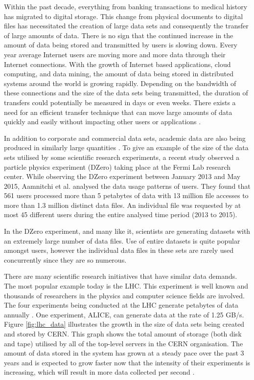 Within the past decade, everything from banking transactions to medical history has migrated to digital storage. This change from physical documents to digital files has necessitated the creation of large data sets and consequently the transfer of large amounts of data. There is no sign that the continued increase in the amount of data being stored and transmitted by users is slowing down. Every year average Internet users are moving more and more data through their Internet connections. With the growth of Internet based applications, cloud computing, and data mining, the amount of data being stored in distributed systems around the world is growing rapidly. Depending on the bandwidth of these connections and the size of the data sets being transmitted, the duration of transfers could potentially be measured in days or even weeks. There exists a need for an efficient transfer technique that can move large amounts of data quickly and easily without impacting other users or applications \cite{Verki1}.

In addition to corporate and commercial data sets, academic data are also being produced in similarly large quantities \cite{Aamnitchi2}. To give an example of the size of the data sets utilised by some scientific research experiments, a recent study observed a particle physics experiment (DZero) taking place at the Fermi Lab research center. While observing the DZero experiment between January 2013 and May 2015, Aamnitchi et al. \cite{Aamnitchi2} analysed the data usage patterns of users. They found that 561 users processed more than 5 petabytes of data with 13 million file accesses to more than 1.3 million distinct data files. An individual file was requested by at most 45 different users during the entire analysed time period (2013 to 2015).

In the DZero experiment, and many like it, scientists are generating datasets with an extremely large number of data files. Use of entire datasets is quite popular amongst users, however the individual data files in these sets are rarely used concurrently since they are so numerous.

There are many scientific research initiatives that have similar data demands. The most popular example today is the LHC. This experiment is well known and thousands of researchers in the physics and computer science fields are involved. The four experiments being conducted at the LHC generate petabytes of data annually \cite{Minoli3, Nicholson4}. One experiment, ALICE, can generate data at the rate of 1.25 GB/s. Figure \ref{fig:lhc_data} illustrates the growth in the size of data sets being created and stored by CERN. This graph shows the total amount of storage (both disk and tape) utilised by all of the top-level servers in the CERN organisation. The amount of data stored in the system has grown at a steady pace over the past 3 years and is expected to grow faster now that the intensity of their experiments is increasing, which will result in more data collected per second \cite{LHC5}. 

